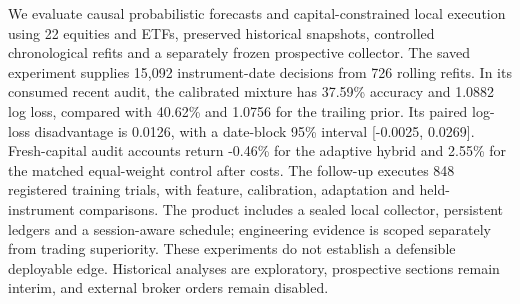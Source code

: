 We evaluate causal probabilistic forecasts and capital-constrained local execution using 22 equities and ETFs, preserved historical snapshots, controlled chronological refits and a separately frozen prospective collector. The saved experiment supplies 15,092 instrument-date decisions from 726 rolling refits. In its consumed recent audit, the calibrated mixture has 37.59\% accuracy and 1.0882 log loss, compared with 40.62\% and 1.0756 for the trailing prior. Its paired log-loss disadvantage is 0.0126, with a date-block 95\% interval [-0.0025, 0.0269]. Fresh-capital audit accounts return -0.46\% for the adaptive hybrid and 2.55\% for the matched equal-weight control after costs. The follow-up executes 848 registered training trials, with feature, calibration, adaptation and held-instrument comparisons. The product includes a sealed local collector, persistent ledgers and a session-aware schedule; engineering evidence is scoped separately from trading superiority. These experiments do not establish a defensible deployable edge. Historical analyses are exploratory, prospective sections remain interim, and external broker orders remain disabled.
